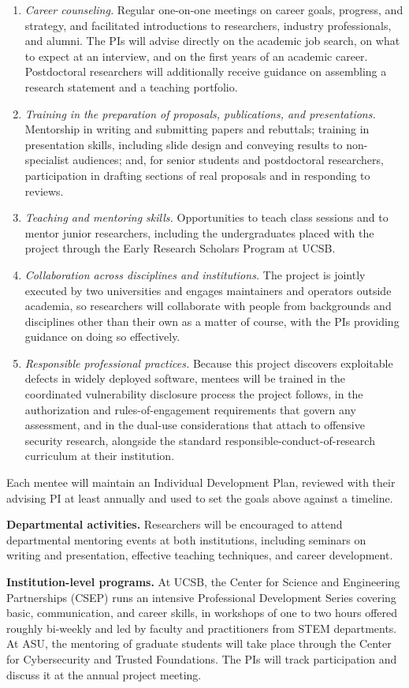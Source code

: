 \documentclass[11pt,letterpaper]{article}
\begin{document}
\begin{enumerate}[label=\arabic*)]
  \item \emph{Career counseling.} Regular one-on-one meetings on career goals,
  progress, and strategy, and facilitated introductions to researchers,
  industry professionals, and alumni. The PIs will advise directly on the
  academic job search, on what to expect at an interview, and on the first
  years of an academic career. Postdoctoral researchers will additionally
  receive guidance on assembling a research statement and a teaching
  portfolio.
  \item \emph{Training in the preparation of proposals, publications, and
  presentations.} Mentorship in writing and submitting papers and rebuttals;
  training in presentation skills, including slide design and conveying
  results to non-specialist audiences; and, for senior students and
  postdoctoral researchers, participation in drafting sections of real
  proposals and in responding to reviews.
  \item \emph{Teaching and mentoring skills.} Opportunities to teach class
  sessions and to mentor junior researchers, including the undergraduates
  placed with the project through the Early Research Scholars Program at UCSB.
  \item \emph{Collaboration across disciplines and institutions.} The project
  is jointly executed by two universities and engages maintainers and
  operators outside academia, so researchers will collaborate with people from
  backgrounds and disciplines other than their own as a matter of course, with
  the PIs providing guidance on doing so effectively.
  \item \emph{Responsible professional practices.} Because this project
  discovers exploitable defects in widely deployed software, mentees will be
  trained in the coordinated vulnerability disclosure process the project
  follows, in the authorization and rules-of-engagement requirements that
  govern any assessment, and in the dual-use considerations that attach to
  offensive security research, alongside the standard responsible-conduct-of-research
  curriculum at their institution.
\end{enumerate}

Each mentee will maintain an Individual Development Plan, reviewed with their
advising PI at least annually and used to set the goals above against a
timeline.

\textbf{Departmental activities.}
Researchers will be encouraged to attend departmental mentoring events at both
institutions, including seminars on writing and presentation, effective
teaching techniques, and career development.

\textbf{Institution-level programs.}
At UCSB, the Center for Science and Engineering Partnerships (CSEP) runs an
intensive Professional Development Series covering basic, communication, and
career skills, in workshops of one to two hours offered roughly bi-weekly and
led by faculty and practitioners from STEM departments. 
At ASU, the mentoring of graduate students will take place through the Center
for Cybersecurity and Trusted Foundations.
The PIs will track participation and discuss it at the annual project meeting.
\end{document}
